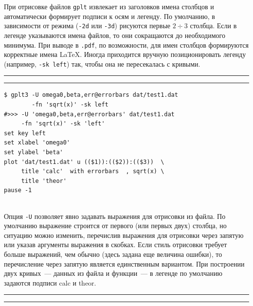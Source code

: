 \documentclass[12pt]{article}
\def\gplt{{\tt gplt}}
\def\pdf{{\tt .pdf}}
\begin{document}
При отрисовке файлов \gplt{} извлекает из заголовков имена столбцов и автоматически формирует подписи к осям и легенду.
По умолчанию, в зависимости от режима (\verb'-2d' или \verb'-3d') рисуются первые $2\div3$ столбца.
Если в легенде указываются имена файлов,
то они сокращаются до необходимого минимума. При выводе в \pdf{}, по возможности, для имен столбцов формируются корректные имена \LaTeX.
Иногда приходится вручную позиционировать легенду (например, \verb'-sk left') так, чтобы она не пересекалась с кривыми.\\

\pagebreak
\noindent\rule{.45\textwidth}{1pt}\hfill {}  \hfill\rule{.45\textwidth}{1pt}

\vspace{3mm}
\noindent
\begin{minipage}[b]{.59\textwidth}
\small
\begin{verbatim}
$ gplt3 -U omega0,beta,err@errorbars dat/test1.dat 
        -fn 'sqrt(x)' -sk left
#>>> -U 'omega0,beta,err@errorbars' dat/test1.dat 
     -fn 'sqrt(x)' -sk 'left'
set key left
set xlabel 'omega0'
set ylabel 'beta'
plot 'dat/test1.dat' u (($1)):(($2)):(($3))  \
     title 'calc'  with errorbars  , sqrt(x) \
     title 'theor'   
pause -1
\end{verbatim}
\end{minipage}
\\[5mm]
Опция \verb'-U' позволяет явно задавать выражения для отрисовки из файла. По умолчанию выражение строится от первого (или первых двух) столбца,
но ситуацию можно изменить, перечислив выражения для отрисовки через запятую или указав аргументы выражения в скобках. Если стиль
отрисовки требует больше выражений, чем обычно (здесь задана еще величина ошибки), то перечисление через запятую является единственным вариантом.
При построении двух кривых~--- данных из файла и функции~--- в легенде по умолчанию задаются подписи calc и theor.\\

\noindent\rule{.45\textwidth}{1pt}\hfill {}  \hfill\rule{.45\textwidth}{1pt}
\end{document}
